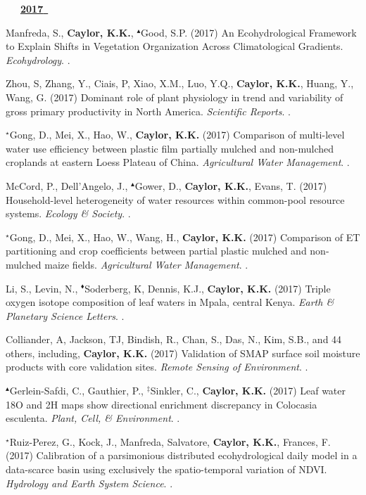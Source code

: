 \begin{etaremune}
\vspace{0.1in}
\mbox{\ \ \ \underline{\textbf{2017 }}}
\vspace{0.1in}

\item Manfreda, S., \textbf{ Caylor, K.K.}, $^{\blacktriangle}$Good, S.P. (2017) An Ecohydrological Framework to Explain Shifts in Vegetation Organization Across Climatological Gradients. \emph{Ecohydrology}. .
\item Zhou, S, Zhang, Y., Ciais, P, Xiao, X.M., Luo, Y.Q., \textbf{ Caylor, K.K.}, Huang, Y., Wang, G. (2017) Dominant role of plant physiology in trend and variability of gross primary productivity in North America. \emph{Scientific Reports}. .
\item $^{\star}$Gong, D., Mei, X., Hao, W., \textbf{ Caylor, K.K.} (2017) Comparison of multi-level water use efficiency between plastic film partially mulched and non-mulched croplands at eastern Loess Plateau of China. \emph{Agricultural Water Management}. .
\item McCord, P., Dell'Angelo, J., $^{\blacktriangle}$Gower, D., \textbf{ Caylor, K.K.}, Evans, T. (2017) Household-level heterogeneity of water resources within common-pool resource systems. \emph{Ecology \& Society}. .
\item $^{\star}$Gong, D., Mei, X., Hao, W., Wang, H., \textbf{ Caylor, K.K.} (2017) Comparison of ET partitioning and crop coefficients between partial plastic mulched and non-mulched maize fields. \emph{Agricultural Water Management}. .
\item Li, S., Levin, N., $^{\blacklozenge}$Soderberg, K, Dennis, K.J., \textbf{ Caylor, K.K.} (2017) Triple oxygen isotope composition of leaf waters in Mpala, central Kenya. \emph{Earth \& Planetary Science Letters}. .
\item Colliander, A, Jackson, TJ, Bindish, R., Chan, S., Das, N., Kim, S.B., and 44 others, including, \textbf{ Caylor, K.K.} (2017) Validation of SMAP surface soil moisture products with core validation sites. \emph{Remote Sensing of Environment}. .
\item $^{\blacktriangle}$Gerlein-Safdi, C., Gauthier, P., $^{\ddagger}$Sinkler, C., \textbf{ Caylor, K.K.} (2017) Leaf water 18O and 2H maps show directional enrichment discrepancy in Colocasia esculenta. \emph{Plant, Cell, \& Environment}. .
\item $^{\star}$Ruiz-Perez, G., Kock, J., Manfreda, Salvatore, \textbf{ Caylor, K.K.}, Frances, F. (2017) Calibration of a parsimonious distributed ecohydrological daily model in a data-scarce basin using exclusively the spatio-temporal variation of NDVI. \emph{Hydrology and Earth System Science}. .


\end{etaremune}
